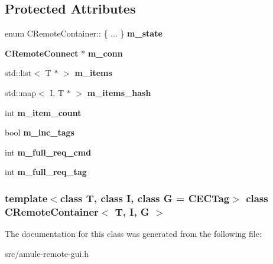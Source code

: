 \subsection*{Protected Attributes}
\begin{DoxyCompactItemize}
\item 
enum CRemoteContainer:: \{ ... \}  {\bfseries m\_\-state}\label{classCRemoteContainer_a52f6cb3470b1dd772df17bd906efcaa3}

\item 
{\bf CRemoteConnect} $\ast$ {\bfseries m\_\-conn}\label{classCRemoteContainer_aab7bbfe630def972705427b15e4b4cd9}

\item 
std::list$<$ T $\ast$ $>$ {\bfseries m\_\-items}\label{classCRemoteContainer_a9bbd5a7a7aba5b1aa125599f14ba1b0c}

\item 
std::map$<$ I, T $\ast$ $>$ {\bfseries m\_\-items\_\-hash}\label{classCRemoteContainer_a7288b3f0f8dde45917dbc308c10e253b}

\item 
int {\bfseries m\_\-item\_\-count}\label{classCRemoteContainer_a05f94f3a7e604254a26e05520a277173}

\item 
bool {\bfseries m\_\-inc\_\-tags}\label{classCRemoteContainer_a17c83d874b62c30f87531d75d4c24280}

\item 
int {\bfseries m\_\-full\_\-req\_\-cmd}\label{classCRemoteContainer_ae1cd01c5df16c4579860efee74efc38c}

\item 
int {\bfseries m\_\-full\_\-req\_\-tag}\label{classCRemoteContainer_a5e3133702c467f36702d914f97ed7798}

\end{DoxyCompactItemize}
\subsubsection*{template$<$class T, class I, class G = CECTag$>$ class CRemoteContainer$<$ T, I, G $>$}



The documentation for this class was generated from the following file:\begin{DoxyCompactItemize}
\item 
src/amule-\/remote-\/gui.h\end{DoxyCompactItemize}
